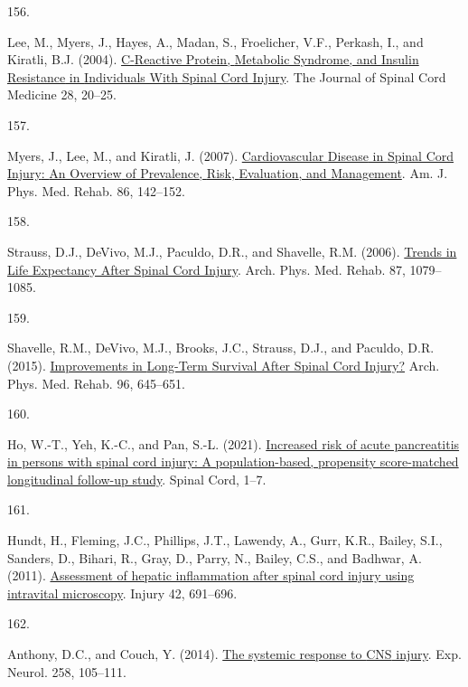\documentclass[
]{article}
\newlength{\cslhangindent}
\newlength{\csllabelwidth}
\newlength{\cslentryspacingunit} %
\newenvironment{CSLReferences}[2] %
 {%
  \setlength{\parindent}{0pt}
  \ifodd #1
  \let\oldpar\par
  \def\par{\hangindent=\cslhangindent\oldpar}
  \fi
  \setlength{\parskip}{#2\cslentryspacingunit}
 }%
 {}
\newcommand{\CSLLeftMargin}[1]{\parbox[t]{\csllabelwidth}{#1}}
\newcommand{\CSLRightInline}[1]{\parbox[t]{\linewidth - \csllabelwidth}{#1}\break}
\begin{document}
\begin{CSLReferences}{0}{0}
\leavevmode{}%
\CSLLeftMargin{156. }
\CSLRightInline{Lee, M., Myers, J., Hayes, A., Madan, S., Froelicher, V.F., Perkash, I., and Kiratli, B.J. (2004). \href{https://doi.org/10.1080/10790268.2005.11753794}{C-{Reactive Protein}, {Metabolic Syndrome}, and {Insulin Resistance} in {Individuals With Spinal Cord Injury}}. The Journal of Spinal Cord Medicine 28, 20--25.}

\leavevmode{}%
\CSLLeftMargin{157. }
\CSLRightInline{Myers, J., Lee, M., and Kiratli, J. (2007). \href{https://doi.org/10.1097/PHM.0b013e31802f0247}{Cardiovascular {Disease} in {Spinal Cord Injury}: {An Overview} of {Prevalence}, {Risk}, {Evaluation}, and {Management}}. Am. J. Phys. Med. Rehab. 86, 142--152.}

\leavevmode{}%
\CSLLeftMargin{158. }
\CSLRightInline{Strauss, D.J., DeVivo, M.J., Paculdo, D.R., and Shavelle, R.M. (2006). \href{https://doi.org/10.1016/j.apmr.2006.04.022}{Trends in {Life Expectancy After Spinal Cord Injury}}. Arch. Phys. Med. Rehab. 87, 1079--1085.}

\leavevmode{}%
\CSLLeftMargin{159. }
\CSLRightInline{Shavelle, R.M., DeVivo, M.J., Brooks, J.C., Strauss, D.J., and Paculdo, D.R. (2015). \href{https://doi.org/10.1016/j.apmr.2014.11.003}{Improvements in {Long-Term Survival After Spinal Cord Injury}?} Arch. Phys. Med. Rehab. 96, 645--651.}

\leavevmode{}%
\CSLLeftMargin{160. }
\CSLRightInline{Ho, W.-T., Yeh, K.-C., and Pan, S.-L. (2021). \href{https://doi.org/10.1038/s41393-021-00643-3}{Increased risk of acute pancreatitis in persons with spinal cord injury: A population-based, propensity score-matched longitudinal follow-up study}. Spinal Cord, 1--7.}

\leavevmode{}%
\CSLLeftMargin{161. }
\CSLRightInline{Hundt, H., Fleming, J.C., Phillips, J.T., Lawendy, A., Gurr, K.R., Bailey, S.I., Sanders, D., Bihari, R., Gray, D., Parry, N., Bailey, C.S., and Badhwar, A. (2011). \href{https://doi.org/10.1016/j.injury.2010.12.013}{Assessment of hepatic inflammation after spinal cord injury using intravital microscopy}. Injury 42, 691--696.}

\leavevmode{}%
\CSLLeftMargin{162. }
\CSLRightInline{Anthony, D.C., and Couch, Y. (2014). \href{https://doi.org/10.1016/j.expneurol.2014.03.013}{The systemic response to {CNS} injury}. Exp. Neurol. 258, 105--111.}


\end{CSLReferences}
\end{document}
